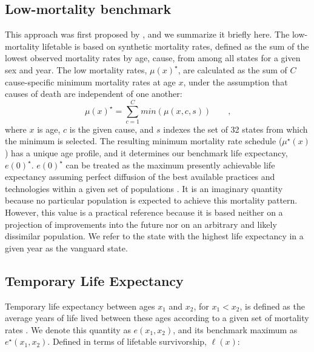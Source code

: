 \documentclass{article}
\newcommand{\dd}{\; \mathrm{d}}
\newcommand{\tc}{\quad\quad\text{,}}
\begin{document}
\begin{spacing}{1.5}
\subsection*{Low-mortality benchmark}
This approach was first proposed by \citet{whelpton1947}, and we summarize it
briefly here. The low-mortality lifetable is based on synthetic mortality
rates, defined as the sum of the lowest observed mortality rates by age, cause,
from among all states for a given sex and year. %
The low mortality rates, $\mu(x)^{\star}$, are calculated as the sum of $C$
cause-specific minimum mortality rates at age $x$, under the assumption that
causes of death are independent of one another:
\begin{equation}
\label{eq:mxmin}
\mu(x)^{\star} = \sum_{c=1}^C min(\mu(x,c,s)) \tc
\end{equation}
where $x$ is age, $c$ is the given cause, and $s$ indexes the set of 32 states
from which the minimum is selected. The resulting minimum mortality rate schedule
($\mu^{\star}(x)$) has a unique age profile, and it determines our benchmark life expectancy, $e(0)^{\star}$.
$e(0)^{\star}$ can be treated as the maximum presently achievable life
expectancy assuming perfect diffusion of the best available practices and
technologies within a given set of populations \citep{vallin2008minimum}. It is
an imaginary quantity because no particular population is expected to achieve
this mortality pattern. However, this value is a practical reference because it
is based neither on a projection of improvements into the future nor on an
arbitrary and likely dissimilar population. We refer to the state with the
highest life expectancy in a given year as the vanguard state.

\subsection*{Temporary Life Expectancy}

Temporary life expectancy between ages
$x_1$ and $x_2$, for $x_1<x_2$, is defined as the average years of life lived
between these ages according to a given set of mortality rates
\citep{arriaga1984}. We denote this quantity as $e(x_1,x_2)$, and its benchmark
maximum as $e^{\star}(x_1,x_2)$. Defined in terms of lifetable survivorship, $\ell(x)$:


\end{spacing}
\end{document}
